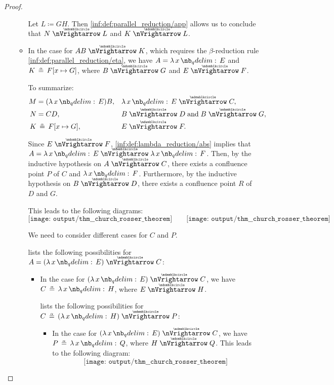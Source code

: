 \begin{proof}
\begin{itemize}
\begin{itemize}
      Let \( L \coloneqq GH \). Then \ref{inf:def:parallel_reduction/app} allows us to conclude that \( N \ppred L \) and \( K \ppred L \).

      \item In the case  for \( AB \ppred K \), which requires the \( \beta \)-reduction rule \ref{inf:def:parallel_reduction/eta}, we have \( A = \qabs x E \) and \( K \aequiv F[x \mapsto G] \), where \( B \ppred G \) and \( E \ppred F \).

      To summarize:
      \begin{align*}
        M &= (\qabs x E) B,           &&\qabs x E \ppred C,            \\
        N &= C D,                     &&B \ppred D \T{and} B \ppred G, \\
        K &\aequiv F[x \mapsto G],    &&E \ppred F.
      \end{align*}

      Since \( E \ppred F \), \ref{inf:def:lambda_reduction/abs} implies that \( A = \qabs x E \ppred \qabs x F \). Then, by the inductive hypothesis on \( A \ppred C \), there exists a confluence point \( P \) of \( C \) and \( \qabs x F \). Furthermore, by the inductive hypothesis on \( B \ppred D \), there exists a confluence point \( R \) of \( D \) and \( G \).

      This leads to the following diagrams:
      \begin{equation*}
        \texttt{[image: output/thm\_\_church\_rosser\_theorem]}
        \quad\quad
        \texttt{[image: output/thm\_\_church\_rosser\_theorem]}
      \end{equation*}

      We need to consider different cases for \( C \) and \( P \).

       lists the following possibilities for \( A = (\qabs x E) \ppred C \):
      \begin{itemize}
        \item In the case  for \( (\qabs x E) \ppred C \), we have \( C \aequiv \qabs x H \), where \( E \ppred H \).

         lists the following possibilities for \( C \aequiv (\qabs x H) \ppred P \):
        \begin{itemize}
          \item In the case  for \( (\qabs x E) \ppred C \), we have \( P \aequiv \qabs x Q \), where \( H \ppred Q \). This leads to the following diagram:
          \begin{equation*}
            \texttt{[image: output/thm\_\_church\_rosser\_theorem]}
          \end{equation*}


\end{itemize}
\end{itemize}
\end{itemize}
\end{itemize}
\end{proof}
